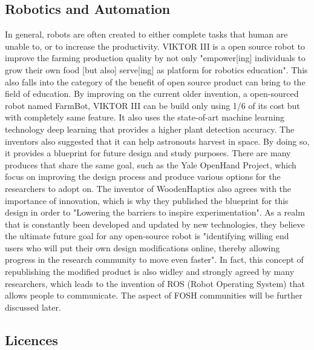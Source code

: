 \documentclass[final-report.tex]{subfiles}
\begin{document}
\subsection{Robotics and Automation}
In general, robots are often created to either complete tasks that human are unable to, or to increase the productivity. 
VIKTOR III is a open source robot to improve the farming production quality by not only "empower[ing] individuals to grow their own food [but also] serve[ing] as platform for robotics education".
This also falls into the category of the benefit of open source product can bring to the field of education. By improving on the current older invention, a open-sourced robot named FarmBot, VIKTOR III can be build only using 1/6 of its cost but with completely same feature. 
It also uses the state-of-art machine learning technology deep learning that provides a higher plant detection accuracy. 
The inventors also suggested that it can help astronouts harvest in space. 
By doing so, it provides a blueprint for future design and study purposes. 
There are many produces that share the same goal, such as the Yale OpenHand Project, which focus on improving the design process and produce various options for the researchers to adopt on. 
The inventor of WoodenHaptics also agrees with the importance of innovation, which is why they published the blueprint for this design in order to "Lowering the barriers to inspire experimentation". 
As a realm that is constantly been developed and updated by new technologies, they believe the ultimate future goal for any open-source robot is "identifying willing end users who will put their own design modifications online, thereby allowing progress in the research community to move even faster". 
In fact, this concept of republishing the modified product is also widley and strongly agreed by many researchers, which leads to the invention of ROS (Robot Operating System) that allows people to communicate. 
The aspect of FOSH communities will be further discussed later. 

\subsection{Licences}
\end{document}
